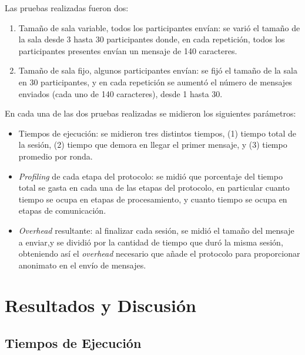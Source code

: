 Las pruebas realizadas fueron dos:

\begin{enumerate}
	\item Tamaño de sala variable, todos los participantes envían: se 
	varió el tamaño de la sala desde 3 hasta 30 participantes donde, en 
	cada repetición, todos los participantes presentes envían un 
	mensaje de 140 caracteres.
	\item Tamaño de sala fijo, algunos participantes envían: se fijó 
	el tamaño de la sala en 30 participantes, y en cada repetición se 
	aumentó el número de mensajes enviados (cada uno de 140 caracteres), 
	desde 1 hasta 30.
\end{enumerate}

En cada una de las dos pruebas realizadas se midieron los siguientes 
parámetros:

\begin{itemize}
	\item Tiempos de ejecución: se midieron tres distintos tiempos, (1) tiempo 
	total de la sesión, (2) tiempo que demora en llegar el primer mensaje, y 
	(3) tiempo promedio por ronda.
	\item \emph{Profiling} de cada etapa del protocolo: se midió que 
	porcentaje del tiempo total se gasta en cada una de las etapas del 
	protocolo, en particular cuanto tiempo se ocupa en etapas de 
	procesamiento, y cuanto tiempo se ocupa en etapas de comunicación.
	\item \emph{Overhead} resultante: al finalizar cada sesión, se midió el 
	tamaño del mensaje a enviar,y se dividió por la cantidad de tiempo que 
	duró la misma sesión, obteniendo así el \emph{overhead} necesario que añade
	el protocolo para proporcionar anonimato en el envío de mensajes.
\end{itemize}

\section{Resultados y Discusión}

\subsection{Tiempos de Ejecución}

